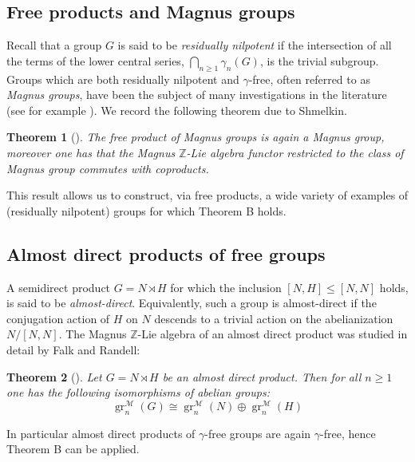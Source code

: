 \documentclass{amsart}
\theoremstyle{plain}
\newtheorem{theorem}{Theorem}
\theoremstyle{definition}
\numberwithin{theorem}{section}
\numberwithin{equation}{section}
\newcommand{\grM}{\operatorname{gr}^{\mathscr M}}
\newcommand{\Z}{\mathbb Z}
\begin{document}
\subsection{Free products and Magnus groups}
Recall that a group $G$ is said to be \emph{residually nilpotent} if the intersection of all the terms of the lower central series, $\bigcap\nolimits_{n \geq 1} \gamma_n(G)$, 
is the trivial subgroup. Groups which are both residually nilpotent and $\gamma$-free, often referred to as \emph{Magnus groups}, have been the subject of many investigations in the literature (see for example \cite{Bau67}). We record the following theorem due to Shmelkin.
\begin{theorem}[{\cite{Shm70}}]\label{th:magnus.groups}
    The free product of Magnus groups is again a Magnus group, moreover one has that the Magnus $\Z$-Lie algebra functor restricted to the class of Magnus group commutes with coproducts.
\end{theorem}
\noindent
This result allows us to construct, via free products, a wide variety of examples of (residually nilpotent) groups for which Theorem B holds.
\subsection{Almost direct products of free groups}

A semidirect product $G = N \rtimes H$ for which the inclusion $[N, H] \leq [N, N]$ holds, is said to be \emph{almost-direct}. Equivalently, such a group is almost-direct if the conjugation action of $H$ on $N$ descends to a trivial action on the abelianization $N/[N, N]$. The Magnus $\Z$-Lie algebra of an almost direct product was studied in detail by Falk and Randell:
\begin{theorem}[\cite{FR85}]\label{th:falk.randell}
	Let $G = N \rtimes H$ be an almost direct product. Then for all $n \geq 1$ one has the following isomorphisms of abelian groups:
\[
		\grM_n(G) \cong \grM_n(N) \oplus \grM_n(H)
\]
\end{theorem} 
\noindent
In particular almost direct products of $\gamma$-free groups are again $\gamma$-free, hence Theorem B can be applied.
\end{document}
